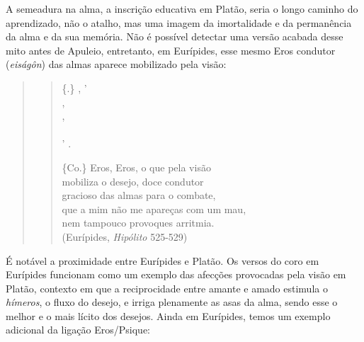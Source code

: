 A semeadura na alma, a inscrição educativa em Platão, seria o longo
caminho do aprendizado, não o atalho, mas uma imagem da imortalidade e
da permanência da alma e da sua memória. Não é possível detectar uma
versão acabada desse mito antes de Apuleio, entretanto, em Eurípides, esse
mesmo Eros condutor (\emph{eiságôn}) das almas aparece mobilizado pela
visão:

 

\begin{quote}
\begin{verse}
\{.\}  ,  ' \\
 ,  \\
   ,\\
     \\
'  .\\


\bigskip


\{Co.\} Eros, Eros, o que pela visão\\
mobiliza o desejo, doce condutor\\
gracioso das almas para o combate,\\
que a mim não me apareças com um mau,\\
nem tampouco provoques arritmia.\\

\hfill (Eurípides, \emph{Hipólito} 525-529)
\end{verse}
\end{quote}

 

É notável a proximidade entre Eurípides e Platão. Os versos do coro em
Eurípides funcionam como um exemplo das afecções provocadas pela visão
em Platão, contexto em que a reciprocidade entre amante e amado estimula
o \emph{hímeros}, o fluxo do desejo, e irriga plenamente as asas da
alma, sendo esse o melhor e o mais lícito dos desejos. Ainda em
Eurípides, temos um exemplo adicional da ligação Eros/\allowbreak{}Psique:

 

